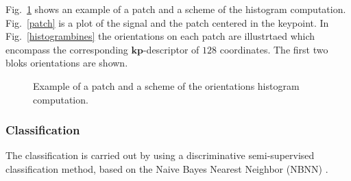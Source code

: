 \documentclass[entropy,article,submit,moreauthors,pdftex,10pt,a4paper]{mdpi}
\begin{document}
Fig.~\ref{fig:sampledescriptor} shows an example of a patch and a scheme of the histogram computation. Fig.~\ref{patch} is a plot of the signal and the patch centered in the keypoint. In Fig.~\ref{histogrambines} the orientations on each patch are illustrtaed which encompass the corresponding $\mathbf{kp}$-descriptor of $128$ coordinates. The first two bloks orientations are shown. 
 

 
\begin{figure}[H]
\centering
{}
\caption{ Example of a patch and a scheme of the orientations histogram computation.}
\label{fig:sampledescriptor}
\end{figure}

\subsubsection{Classification} \label{Classification}

The classification is carried out by using a discriminative semi-supervised classification method, based on the Naive Bayes Nearest Neighbor (NBNN) \citep{Boiman2008}.

\end{document}
